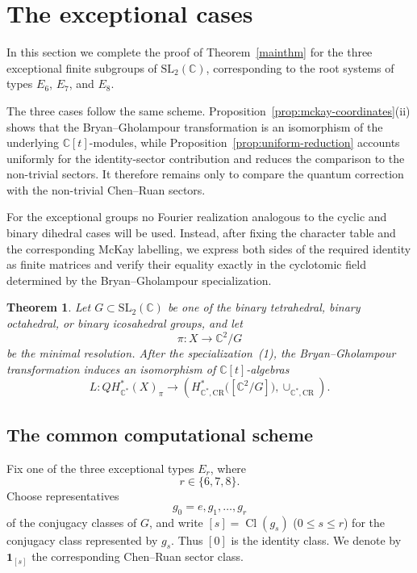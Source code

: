 \documentclass[a4paper,reqno]{amsart}
\theoremstyle{plain} %
\newtheorem{thm}{Theorem}[section]
\theoremstyle{definition} %
\theoremstyle{remark} %
\newcommand{\1}{\mathds{1}}   %
\begin{document}
\section{The exceptional cases}
\label{sec:exceptional}

In this section we complete the proof of Theorem~\ref{mainthm} for the three
exceptional finite subgroups of \(\mathrm{SL}_2(\mathbb C)\), corresponding
to the root systems of types \(E_6\), \(E_7\), and \(E_8\).

The three cases follow the same scheme. Proposition~\ref{prop:mckay-coordinates}(ii) 
shows that the Bryan--Gholampour transformation is an isomorphism of the underlying
\(\mathbb C[t]\)-modules, while Proposition~\ref{prop:uniform-reduction} accounts uniformly for
the identity-sector contribution and reduces the comparison to the
non-trivial sectors. It therefore remains only to compare the quantum
correction with the non-trivial Chen--Ruan sectors.

For the exceptional groups no Fourier realization analogous to the
cyclic and binary dihedral cases will be used.  Instead, after fixing the
character table and the corresponding McKay labelling, we express both
sides of the required identity as finite matrices and verify their
equality exactly in the cyclotomic field determined by the
Bryan--Gholampour specialization.

\begin{thm}
\label{thm:exceptional}
Let \(G\subset \mathrm{SL}_2(\mathbb C)\) be one of the binary
tetrahedral, binary octahedral, or binary icosahedral groups, and let
\[
\pi:X\longrightarrow \mathbb C^2/G
\]
be the minimal resolution.  After the specialization~(1), the
Bryan--Gholampour transformation induces an isomorphism of
\(\mathbb C[t]\)-algebras
\[
L:
QH_{\mathbb C^*}^*(X)_\pi
\longrightarrow
\left(
H_{\mathbb C^*,\mathrm{CR}}^*
   \bigl([\mathbb C^2/G]\bigr),
\cup_{\mathbb C^*,\mathrm{CR}}
\right).
\]
\end{thm}

\subsection{The common computational scheme}
\label{subsec:exceptional-common}

Fix one of the three exceptional types \(E_r\), where
\[
r\in\{6,7,8\}.
\]
Choose representatives
\[
g_0=e,g_1,\ldots,g_r
\]
of the conjugacy classes of \(G\), and write $[s]=\operatorname{Cl}(g_s)$ ($0\le s\le r$)
for the conjugacy class represented by \(g_s\).
Thus \([0]\) is the identity class.  We denote by
\(\mathbf 1_{[s]}\) the corresponding Chen--Ruan sector class.
\end{document}
